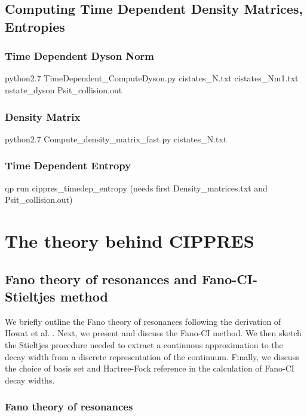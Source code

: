 \documentclass[a4paper, 10 pt]{report}
\begin{document}
\section{Computing Time Dependent Density Matrices, Entropies}
\newpage

\subsection{Time Dependent Dyson Norm}

python2.7 TimeDependent\_ComputeDyson.py cistates\_N.txt cistates\_Nm1.txt nstate\_dyson Psit\_collision.out

\subsection{Density Matrix}

python2.7 Compute\_density\_matrix\_fast.py cistates\_N.txt

\subsection{Time Dependent Entropy}

qp run cippres\_timedep\_entropy (needs first Density\_matrices.txt and Psit\_collision.out)

\chapter{The theory behind CIPPRES}

\section{Fano theory of resonances and Fano-CI-Stieltjes method}

We briefly outline the Fano theory of resonances following the 
derivation of Howat et al. \cite{Howat78:1575}. Next, we present and discuss 
the Fano-CI method. We then sketch the Stieltjes procedure needed to extract a 
continuous approximation to the decay width from a discrete representation of 
the continuum. Finally, we discuss the choice of basis set and Hartree-Fock 
reference in the calculation of Fano-CI decay widths.

\subsection{Fano theory of resonances}
\end{document}
